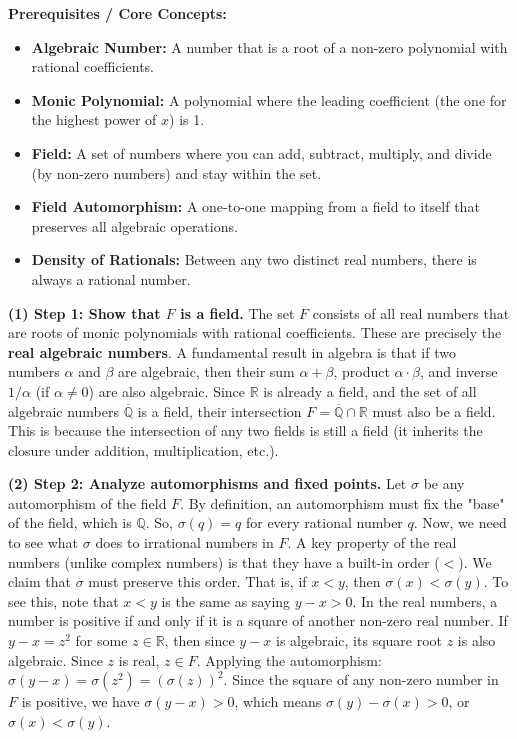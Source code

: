\begin{solution}
\textbf{Prerequisites / Core Concepts:}
\begin{itemize}
    \item \textbf{Algebraic Number:} A number that is a root of a non-zero polynomial with rational coefficients.
    \item \textbf{Monic Polynomial:} A polynomial where the leading coefficient (the one for the highest power of $x$) is 1.
    \item \textbf{Field:} A set of numbers where you can add, subtract, multiply, and divide (by non-zero numbers) and stay within the set.
    \item \textbf{Field Automorphism:} A one-to-one mapping from a field to itself that preserves all algebraic operations.
    \item \textbf{Density of Rationals:} Between any two distinct real numbers, there is always a rational number.
\end{itemize}

\textbf{(1) Step 1: Show that $F$ is a field.}
The set $F$ consists of all real numbers that are roots of monic polynomials with rational coefficients. These are precisely the \textbf{real algebraic numbers}.
A fundamental result in algebra is that if two numbers $\alpha$ and $\beta$ are algebraic, then their sum $\alpha + \beta$, product $\alpha \cdot \beta$, and inverse $1/\alpha$ (if $\alpha \neq 0$) are also algebraic.
Since $\mathbb{R}$ is already a field, and the set of all algebraic numbers $\overline{\mathbb{Q}}$ is a field, their intersection $F = \overline{\mathbb{Q}} \cap \mathbb{R}$ must also be a field. This is because the intersection of any two fields is still a field (it inherits the closure under addition, multiplication, etc.).

\textbf{(2) Step 2: Analyze automorphisms and fixed points.}
Let $\sigma$ be any automorphism of the field $F$. By definition, an automorphism must fix the "base" of the field, which is $\mathbb{Q}$. So, $\sigma(q) = q$ for every rational number $q$.
Now, we need to see what $\sigma$ does to irrational numbers in $F$. A key property of the real numbers (unlike complex numbers) is that they have a built-in order ($<$).
We claim that $\sigma$ must preserve this order. That is, if $x < y$, then $\sigma(x) < \sigma(y)$.
To see this, note that $x < y$ is the same as saying $y - x > 0$. In the real numbers, a number is positive if and only if it is a square of another non-zero real number.
If $y - x = z^2$ for some $z \in \mathbb{R}$, then since $y - x$ is algebraic, its square root $z$ is also algebraic. Since $z$ is real, $z \in F$.
Applying the automorphism: $\sigma(y - x) = \sigma(z^2) = (\sigma(z))^2$.
Since the square of any non-zero number in $F$ is positive, we have $\sigma(y - x) > 0$, which means $\sigma(y) - \sigma(x) > 0$, or $\sigma(x) < \sigma(y)$.


\end{solution}
